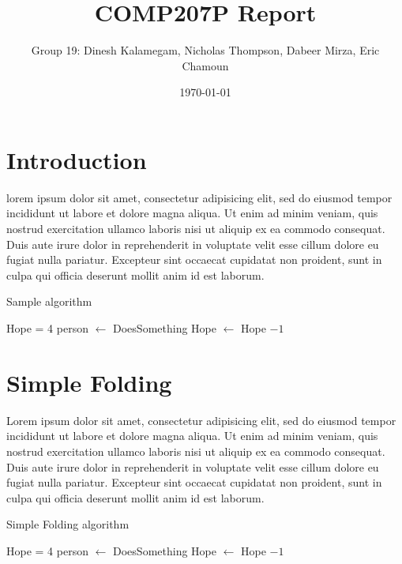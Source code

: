 \documentclass[11pt]{article}
\begin{document}
\title{COMP207P Report}
\author{Group 19: Dinesh Kalamegam, Nicholas Thompson, Dabeer Mirza, Eric Chamoun}
\date{\today}
\maketitle

\section{Introduction}
lorem ipsum dolor sit amet, consectetur adipisicing elit, sed do eiusmod tempor incididunt ut labore et dolore magna aliqua. Ut enim ad minim veniam, quis nostrud exercitation ullamco laboris nisi ut aliquip ex ea commodo consequat. Duis aute irure dolor in reprehenderit in voluptate velit esse cillum dolore eu fugiat nulla pariatur. Excepteur sint occaecat cupidatat non proident, sunt in culpa qui officia deserunt mollit anim id est laborum.
\begin{algorithm}[H]
\caption{Sample algorithm}
\begin{algorithmic}[1]
  \State Hope = 4
  \State person $\gets$ DoesSomething
  \Else
  \State Hope $\gets$ Hope $-1$
  \EndIf
  \EndWhile
\end{algorithmic}
\end{algorithm}
\section{Simple Folding}
Lorem ipsum dolor sit amet, consectetur adipisicing elit, sed do eiusmod tempor incididunt ut labore et dolore magna aliqua. Ut enim ad minim veniam, quis nostrud exercitation ullamco laboris nisi ut aliquip ex ea commodo consequat. Duis aute irure dolor in reprehenderit in voluptate velit esse cillum dolore eu fugiat nulla pariatur. Excepteur sint occaecat cupidatat non proident, sunt in culpa qui officia deserunt mollit anim id est laborum.
\begin{algorithm}[H]
\caption{Simple Folding algorithm}
\begin{algorithmic}[1]
  \State Hope = 4
  \State person $\gets$ DoesSomething
  \Else
  \State Hope $\gets$ Hope $-1$
  \EndIf
  \EndWhile
\end{algorithmic}
\end{algorithm}
\end{document}
